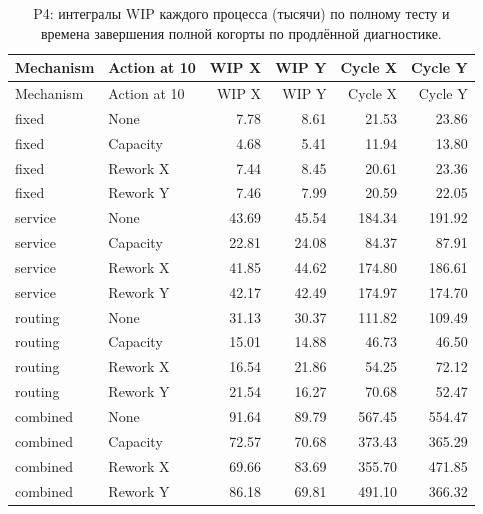 \begin{longtable}{llrrrr}\caption{P4: интегралы WIP каждого процесса (тысячи) по полному тесту и времена завершения полной когорты по продлённой диагностике.}\\\toprule

Mechanism & Action at 10 & WIP X & WIP Y & Cycle X & Cycle Y\\\midrule\endfirsthead

\toprule Mechanism & Action at 10 & WIP X & WIP Y & Cycle X & Cycle Y\\\midrule\endhead

fixed & None & 7.78 & 8.61 & 21.53 & 23.86\\

fixed & Capacity & 4.68 & 5.41 & 11.94 & 13.80\\

fixed & Rework X & 7.44 & 8.45 & 20.61 & 23.36\\

fixed & Rework Y & 7.46 & 7.99 & 20.59 & 22.05\\

service & None & 43.69 & 45.54 & 184.34 & 191.92\\

service & Capacity & 22.81 & 24.08 & 84.37 & 87.91\\

service & Rework X & 41.85 & 44.62 & 174.80 & 186.61\\

service & Rework Y & 42.17 & 42.49 & 174.97 & 174.70\\

routing & None & 31.13 & 30.37 & 111.82 & 109.49\\

routing & Capacity & 15.01 & 14.88 & 46.73 & 46.50\\

routing & Rework X & 16.54 & 21.86 & 54.25 & 72.12\\

routing & Rework Y & 21.54 & 16.27 & 70.68 & 52.47\\

combined & None & 91.64 & 89.79 & 567.45 & 554.47\\

combined & Capacity & 72.57 & 70.68 & 373.43 & 365.29\\

combined & Rework X & 69.66 & 83.69 & 355.70 & 471.85\\

combined & Rework Y & 86.18 & 69.81 & 491.10 & 366.32\\

\bottomrule\end{longtable}

